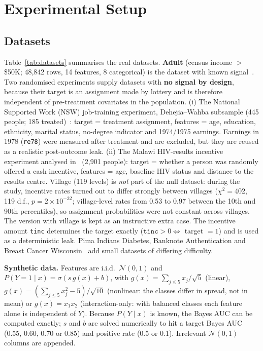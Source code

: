 \section{Experimental Setup}
\label{sec:setup}

\subsection{Datasets}

Table~\ref{tab:datasets} summarises the real datasets. \textbf{Adult} (census income $>$\$50K; 48{,}842 rows, 14 features, 8 categorical) is the dataset with known signal~\cite{dua2019}. Two randomised experiments supply datasets with \textbf{no signal by design}, because their target is an assignment made by lottery and is therefore independent of pre-treatment covariates in the population. (i) The National Supported Work (NSW) job-training experiment, Dehejia--Wahba subsample (445 people; 185 treated)~\cite{imbens2015,cunningham2021}: target = treatment assignment, features = age, education, ethnicity, marital status, no-degree indicator and 1974/1975 earnings. Earnings in 1978 (\texttt{re78}) were measured after treatment and are excluded, but they are reused as a realistic post-outcome leak. (ii) The Malawi HIV-results incentive experiment analysed in~\cite{cunningham2021} (2{,}901 people): target = whether a person was randomly offered a cash incentive, features = age, baseline HIV status and distance to the results centre. Village (119 levels) is \emph{not} part of the null dataset: during the study, incentive rates turned out to differ strongly between villages ($\chi^2=402$, 119 d.f., $p=2\times10^{-32}$; village-level rates from 0.53 to 0.97 between the 10th and 90th percentiles), so assignment probabilities were not constant across villages. The version with village is kept as an instructive extra case. The incentive amount \texttt{tinc} determines the target exactly ($\texttt{tinc}>0 \Leftrightarrow$ target $=1$) and is used as a deterministic leak. Pima Indians Diabetes, Banknote Authentication and Breast Cancer Wisconsin~\cite{dua2019} add small datasets of differing difficulty.



\textbf{Synthetic data.} Features are i.i.d.\ $\mathcal{N}(0,1)$ and $P(Y{=}1\mid x)=\sigma(s\,g(x)+b)$, with $g(x)=\sum_{j\le5}x_j/\sqrt5$ (linear), $g(x)=(\sum_{j\le 5}x_j^2-5)/\sqrt{10}$ (nonlinear: the classes differ in spread, not in mean) or $g(x)=x_1x_2$ (interaction-only: with balanced classes each feature alone is independent of $Y$). Because $P(Y\mid x)$ is known, the Bayes AUC can be computed exactly; $s$ and $b$ are solved numerically to hit a target Bayes AUC (0.55, 0.60, 0.70 or 0.85) and positive rate (0.5 or 0.1). Irrelevant $\mathcal{N}(0,1)$ columns are appended.


